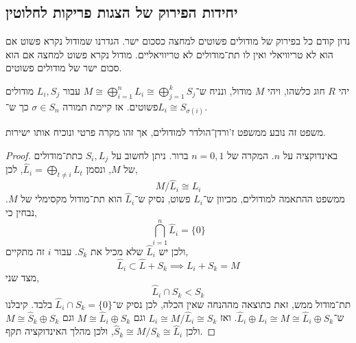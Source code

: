 \subsection{יחידות הפירוק של הצגות פריקות לחלוטין}
נדון קודם כל בפירוק של מודולים פשוטים למחצה כסכום ישר.
הגדרנו שמודול נקרא פשוט אם הוא לא טריוויאלי ואין לו תת־מודולים לא טריוויאליים.
מודול נקרא פשוט למחצה אם הוא סכום ישר של מודולים פשוטים.
\begin{theorem}
	יהי $R$ חוג כלשהו, ויהי $M$ מודול, ונניח ש־$M \cong \bigoplus_{i = 1}^n L_i \cong \bigoplus_{j = 1}^k S_j$ עבור $L_i, S_j$ מודולים פשוטים.
	אז קיימת תמורה $\sigma \in S_n$ כך ש־$L_i \cong S_{\sigma(i)}$.
\end{theorem}
\begin{remark}
	משפט זה נובע ממשפט ז'ורדן־הולדר למודולים, אך זהו מקרה פרטי ונוכיח אותו ישירות.
\end{remark}
\begin{proof}
	באינדוקציה על $n$.
	המקרה של $n = 0, 1$ ברור.
	ניתן לחשוב על $S_i, L_j$ כתת־מודולים של $M$, ונסמן $\hat{L}_i = \bigoplus_{t \ne i} L_t$, לכן,
	\[
		M / \hat{L}_i
		\cong L_i
	\]
	ממשפט ההתאמה למודולים, מכיוון ש־$L_i$ פשוט, נסיק ש־$\hat{L}_i$ הוא תת־מודול מקסימלי של $M$.
	נבחין כי,
	\[
		\bigcap_{i = 1}^n \hat{L}_i
		= \{ 0 \}
	\]
	ולכן יש $\hat{L}_i$ שלא מכיל את $S_k$.
	עבור $i$ זה מתקיים,
	\[
		\hat{L}_i
		\subset \hat{L} + S_k
		\implies L_i + S_k = M
	\]
	מצד שני,
	\[
		\hat{L}_i \cap S_k
		< S_k
	\]
	תת־מודול ממש, זאת כתוצאה מההנחה שאין הכלה, לכן נסיק ש־$\hat{L}_i \cap S_k = \{ 0 \}$ בלבד.
	קיבלנו ש־$\hat{L}_i \oplus L_i \cong M \cong \hat{L}_i \oplus S_k$.
	ואז $L_i \cong M / \hat{L}_i \cong S_k$ וגם $M \cong \hat{L}_i \oplus S_k$ וגם $M \cong \hat{S}_k \oplus S_k$ ולכן $\hat{S}_k \cong M / S_k \cong \hat{L}_i$, ולכן מהלך האינדוקציה תקף.
\end{proof}

